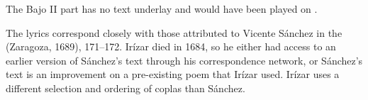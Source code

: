 

The Bajo II part has no text underlay and would have been played on .

The lyrics correspond closely with those attributed to Vicente Sánchez in the  (Zaragoza, 1689), 171--172.
Irízar died in 1684, so he either had access to an earlier version of Sánchez's text through his correspondence network, or Sánchez's text is an improvement on a pre-existing poem that Irízar used.
Irízar uses a different selection and ordering of coplas than Sánchez.